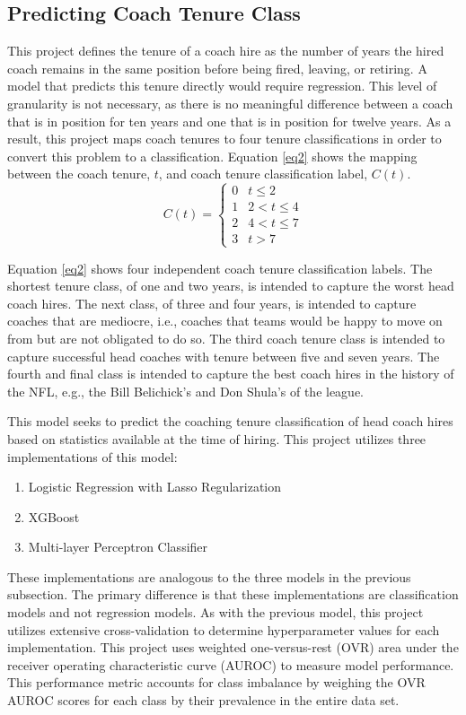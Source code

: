 \documentclass[conference]{IEEEtran}
\begin{document}
\subsection{Predicting Coach Tenure Class}
This project defines the tenure of a coach hire as the number of years the hired coach remains in the same position before being fired, leaving, or retiring. A model that predicts this tenure directly would require regression. This level of granularity is not necessary, as there is no meaningful difference between a coach that is in position for ten years and one that is in position for twelve years. As a result, this project maps coach tenures to four tenure classifications in order to convert this problem to a classification. Equation \eqref{eq2} shows the mapping between the coach tenure, $t$, and coach tenure classification label, $C(t)$.
\begin{equation}
        C(t)=
        \begin{cases}
            0 &t \leq 2 		\\
            1 &2 < t \leq 4 \\
            2 &4 < t \leq 7 \\
            3 &t > 7
        \end{cases}
        \label{eq2}
\end{equation}

Equation \eqref{eq2} shows four independent coach tenure classification labels. The shortest tenure class, of one and two years, is intended to capture the worst head coach hires. The next class, of three and four years, is intended to capture coaches that are mediocre, i.e., coaches that teams would be happy to move on from but are not obligated to do so. The third coach tenure class is intended to capture successful head coaches with tenure between five and seven years. The fourth and final class is intended to capture the best coach hires in the history of the NFL, e.g., the Bill Belichick's and Don Shula's of the league.

This model seeks to predict the coaching tenure classification of head coach hires based on statistics available at the time of hiring. This project utilizes three implementations of this model:
\begin{enumerate}
  \item Logistic Regression with Lasso Regularization\cite{b7}
  \item XGBoost\cite{b8}
  \item Multi-layer Perceptron Classifier\cite{b7}
\end{enumerate}
These implementations are analogous to the three models in the previous subsection. The primary difference is that these implementations are classification models and not regression models. As with the previous model, this project utilizes extensive cross-validation to determine hyperparameter values for each implementation. This project uses weighted one-versus-rest (OVR) area under the receiver operating characteristic curve (AUROC) to measure model performance. This performance metric accounts for class imbalance by weighing the OVR AUROC scores for each class by their prevalence in the entire data set.
\end{document}
